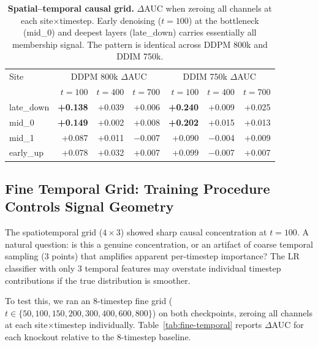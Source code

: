 \documentclass[10pt,conference]{IEEEtran}
\begin{document}
\begin{table}[t]
\centering
\caption{\textbf{Spatial--temporal causal grid.} $\Delta$AUC when zeroing all
channels at each site$\times$timestep. Early denoising ($t{=}100$) at the
bottleneck (mid\_0) and deepest layers (late\_down) carries essentially all
membership signal. The pattern is identical across DDPM 800k and DDIM 750k.}
\label{tab:spatiotemporal-ko}
\centering
\scriptsize
\begin{tabular}{lrrrrrr}
\toprule
Site & \multicolumn{3}{c}{DDPM 800k $\Delta$AUC} & \multicolumn{3}{c}{DDIM 750k $\Delta$AUC} \\
& $t{=}100$ & $t{=}400$ & $t{=}700$ & $t{=}100$ & $t{=}400$ & $t{=}700$ \\
\midrule
late\_down & \textbf{+0.138} & +0.039 & +0.006 & \textbf{+0.240} & +0.009 & +0.025 \\
mid\_0     & \textbf{+0.149} & +0.002 & +0.008 & \textbf{+0.202} & +0.015 & +0.013 \\
mid\_1     & +0.087 & +0.011 & $-$0.007 & +0.090 & $-$0.004 & +0.009 \\
early\_up  & +0.078 & +0.032 & +0.007 & +0.099 & $-$0.007 & +0.007 \\
\bottomrule
\end{tabular}
\end{table}

\subsection{Fine Temporal Grid: Training Procedure Controls Signal Geometry}

The spatiotemporal grid ($4{\times}3$) showed sharp causal concentration at
$t{=}100$. A natural question: is this a genuine concentration, or an artifact
of coarse temporal sampling (3 points) that amplifies apparent per-timestep
importance? The LR classifier with only 3 temporal features may overstate
individual timestep contributions if the true distribution is smoother.

To test this, we ran an 8-timestep fine grid ($t \in \{50,100,150,200,300,
400,600,800\}$) on both checkpoints, zeroing all channels at each
site$\times$timestep individually. Table~\ref{tab:fine-temporal} reports
$\Delta$AUC for each knockout relative to the 8-timestep baseline.
\end{document}
